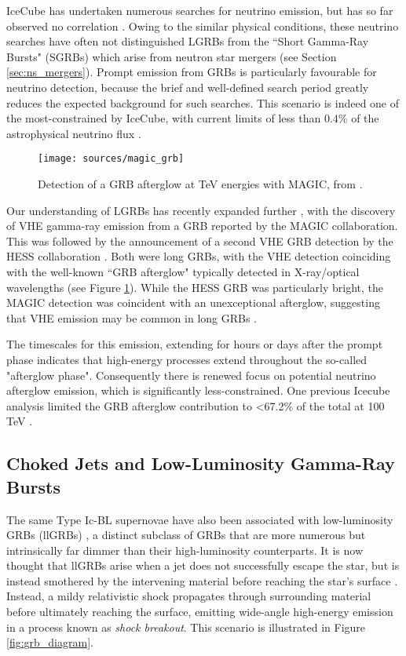 IceCube has undertaken numerous searches for neutrino emission, but has so far observed no correlation . Owing to the similar physical conditions, these neutrino searches have often not distinguished LGRBs from the ``Short Gamma-Ray Bursts" (SGRBs) which arise from neutron star mergers (see Section \ref{sec:ns_mergers}). Prompt emission from GRBs is particularly favourable for neutrino detection, because the brief and well-defined search period greatly reduces the expected background for such searches. This scenario is indeed one of the most-constrained by IceCube, with current limits of less than 0.4\% of the astrophysical neutrino flux \cite{ic_grb_17}. 

\begin{figure}[!ht]
	\centering \texttt{[image: sources/magic\_grb]}
	\caption{Detection of a GRB afterglow at TeV energies with MAGIC, from \cite{magic_grb_19}.}
	\label{fig:magic_grb}
\end{figure}

Our understanding of LGRBs has recently expanded further , with the discovery of VHE gamma-ray emission from a GRB reported by the MAGIC collaboration. This was followed by the announcement of a second VHE GRB detection by the HESS collaboration . Both were long GRBs, with the VHE detection coinciding with the well-known ``GRB afterglow" typically detected in X-ray/optical wavelengths (see Figure \ref{fig:magic_grb}). While the HESS GRB was particularly bright, the MAGIC detection was coincident with an unexceptional afterglow, suggesting that VHE emission may be common in long GRBs .

The timescales for this emission, extending for hours or days after the prompt phase indicates that high-energy processes extend throughout the so-called "afterglow phase". Consequently there is renewed focus on potential neutrino afterglow emission, which is significantly less-constrained. One previous Icecube analysis limited the GRB afterglow contribution to <67.2\% of the total at 100 TeV .

\subsection*{Choked Jets and Low-Luminosity Gamma-Ray Bursts}

The same Type Ic-BL supernovae have also been associated with low-luminosity GRBs (llGRBs)  , a distinct subclass of GRBs that are more numerous but intrinsically far dimmer than their high-luminosity counterparts. It is now thought that llGRBs arise when a jet does not successfully escape the star, but is instead smothered by the intervening material before reaching the star's surface . Instead, a mildy relativistic shock propagates through surrounding material before ultimately reaching the surface, emitting wide-angle high-energy emission in a process known as \emph{shock breakout}. This scenario is illustrated in Figure \ref{fig:grb_diagram}.

